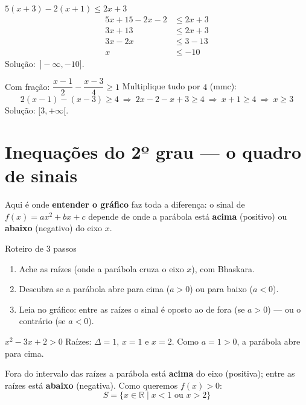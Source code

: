 \documentclass[12pt,a4paper]{article}
\begin{document}
\begin{exemplo}{$5(x+3)-2(x+1)\le 2x+3$}
\begin{align*}
5x+15-2x-2 &\le 2x+3\\
3x+13 &\le 2x+3\\
3x-2x &\le 3-13\\
x &\le -10
\end{align*}
Solução: $\,]-\infty,-10]$.
\end{exemplo}

\begin{exemplo}{Com fração: $\dfrac{x-1}{2}-\dfrac{x-3}{4}\ge1$}
Multiplique tudo por $4$ (mmc):
\[
2(x-1)-(x-3) \ge 4 \ \Rightarrow\ 2x-2-x+3\ge4 \ \Rightarrow\ x+1\ge4 \ \Rightarrow\ x\ge3
\]
Solução: $[3,+\infty[$.
\end{exemplo}

\section{Inequações do 2º grau — o quadro de sinais}

Aqui é onde \textbf{entender o gráfico} faz toda a diferença: o sinal de
$f(x)=ax^2+bx+c$ depende de onde a parábola está \textbf{acima} (positivo)
ou \textbf{abaixo} (negativo) do eixo $x$.

\begin{dica}{Roteiro de 3 passos}
\begin{enumerate}[nosep]
  \item Ache as raízes (onde a parábola cruza o eixo $x$), com Bhaskara.
  \item Descubra se a parábola abre para cima ($a>0$) ou para baixo ($a<0$).
  \item Leia no gráfico: entre as raízes o sinal é oposto ao de fora
        (se $a>0$) — ou o contrário (se $a<0$).
\end{enumerate}
\end{dica}

\begin{exemplo}{$x^2-3x+2>0$}
Raízes: $\Delta=1$, $x=1$ e $x=2$. Como $a=1>0$, a parábola abre para cima.
\begin{center}
\end{center}
Fora do intervalo das raízes a parábola está \textbf{acima} do eixo
(positiva); entre as raízes está \textbf{abaixo} (negativa). Como
queremos $f(x)>0$:
\[
S=\{x\in\mathbb{R}\mid x<1 \text{ ou } x>2\}
\]
\end{exemplo}
\end{document}
